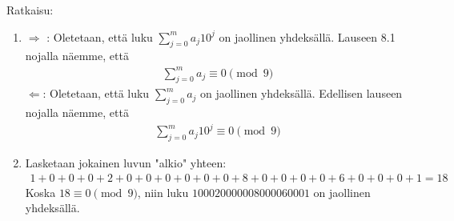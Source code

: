 \documentclass[11pt,a4paper]{amsart}
\newcommand{\1}{\mathbf{1}}
\begin{document}
\begin{Solution}{Ratkaisu:}
	\begin{enumerate}
		\item $\Rightarrow$ : Oletetaan, että luku $\sum_{j=0}^ma_j10^j$ on jaollinen yhdeksällä. Lauseen 8.1 nojalla näemme, että
		\begin{align*}
			\sum_{j=0}^m a_j \equiv 0 \pmod{9}
		\end{align*}
		$\Leftarrow$: Oletetaan, että luku $\sum_{j=0}^m a_j$ on jaollinen yhdeksällä. Edellisen lauseen nojalla näemme, että
		\begin{align*}
			\sum_{j=0}^m a_j 10^j \equiv 0 \pmod{9}
		\end{align*}
		\item Lasketaan jokainen luvun "alkio" yhteen:
		\begin{align*}
			1+0+0+0+2+0+0+0+0+0+0+8+0+0+0+0+6+0+0+0+1=18
		\end{align*}
		Koska $18 \equiv 0 \pmod{9}$, niin luku $100020000008000060001$ on jaollinen yhdeksällä.
		\end{enumerate}
\end{Solution}
\end{document}

